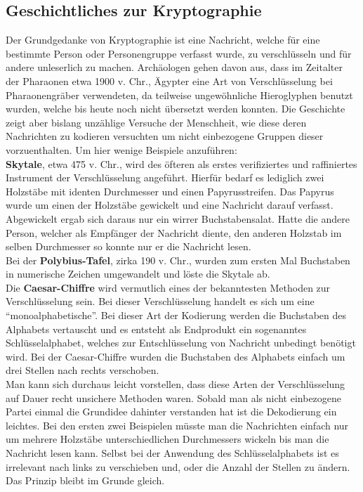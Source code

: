 \documentclass[german,12pt,a4paper]{article}
\begin{document}
\subsection{Geschichtliches zur Kryptographie}
Der Grundgedanke von Kryptographie ist eine Nachricht, welche für eine bestimmte Person oder Personengruppe verfasst wurde, zu verschlüsseln und für andere unleserlich zu machen. Archäologen gehen davon aus, dass im Zeitalter der Pharaonen etwa 1900 v. Chr., Ägypter eine Art von Verschlüsselung bei Pharaonengräber verwendeten, da teilweise ungewöhnliche Hieroglyphen benutzt wurden, welche bis heute noch nicht übersetzt werden konnten. Die Geschichte zeigt aber bislang unzählige Versuche der Menschheit, wie diese deren Nachrichten zu kodieren versuchten um nicht einbezogene Gruppen dieser vorzuenthalten.
Um hier wenige Beispiele anzuführen:\\

\textbf{Skytale}, etwa 475 v. Chr., wird des öfteren als erstes verifiziertes und raffiniertes Instrument der Verschlüsselung angeführt. Hierfür bedarf es lediglich zwei  Holzstäbe mit identen Durchmesser und einen Papyrusstreifen. Das Papyrus wurde um einen der Holzstäbe gewickelt und eine Nachricht darauf verfasst. Abgewickelt ergab sich daraus nur ein wirrer Buchstabensalat. Hatte die andere Person, welcher als Empfänger der Nachricht diente, den anderen Holzstab im selben Durchmesser so konnte nur er die Nachricht lesen.\\

Bei der \textbf{Polybius-Tafel}, zirka 190 v. Chr., wurden zum ersten Mal Buchstaben in numerische Zeichen umgewandelt und löste die Skytale ab.\\

Die \textbf{Caesar-Chiffre} wird vermutlich eines der bekanntesten Methoden zur Verschlüsselung sein. Bei dieser Verschlüsselung handelt es sich um eine “monoalphabetische”. Bei dieser Art der Kodierung werden die Buchstaben des Alphabets vertauscht und es entsteht als Endprodukt ein sogenanntes Schlüsselalphabet, welches zur Entschlüsselung von Nachricht unbedingt benötigt wird. Bei der Caesar-Chiffre wurden die Buchstaben des Alphabets einfach um drei Stellen nach rechts verschoben.\\
Man kann sich durchaus leicht vorstellen, dass diese Arten der Verschlüsselung auf Dauer recht unsichere Methoden waren. Sobald man als nicht einbezogene Partei einmal die Grundidee dahinter verstanden hat ist die Dekodierung ein leichtes. Bei den ersten zwei Beispielen müsste man die Nachrichten einfach nur um mehrere Holzstäbe unterschiedlichen Durchmessers wickeln bis man die Nachricht lesen kann. Selbst bei der Anwendung des Schlüsselalphabets ist es irrelevant nach links zu verschieben und, oder die Anzahl der Stellen zu ändern. Das Prinzip bleibt im Grunde gleich.\\
\end{document}
